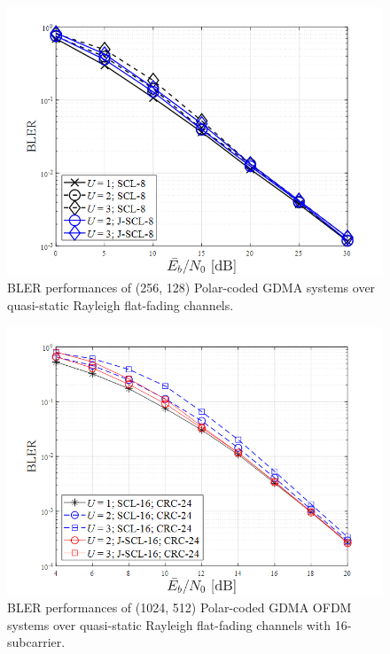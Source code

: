 \begin{figure}[b!]
 \centering
 \includegraphics[width=14cm]{fig/bler_polar_scl.png}
 \caption{BLER performances of (256, 128) Polar-coded GDMA systems over quasi-static Rayleigh flat-fading channels.}
 \label{fig:bler_polar_scl}
\end{figure}


\begin{figure}[t!]
 \centering
 \includegraphics[width=14cm]{fig/bler_gdma_ofdm_polar_scl.png}
 \caption{BLER performances of (1024, 512) Polar-coded GDMA OFDM systems over quasi-static Rayleigh flat-fading channels with 16-subcarrier.}
 \label{fig:bler_ofdm_polar_scl}
\end{figure}

